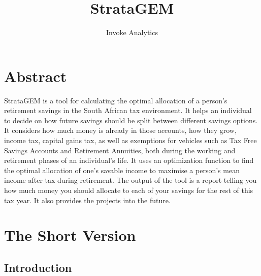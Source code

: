 \documentclass[a4paper, justified]{tufte-handout}
\title{StrataGEM}
\author[]{Invoke Analytics}
\newcommand{\blankpage}{\newpage\hbox{}\thispagestyle{empty}\newpage}
\begin{document}



\maketitle


\begin{fullwidth}

\setlength{\parindent}{0pt}



\end{fullwidth}








\section{Abstract} \label{ch:intro}
StrataGEM is a tool for calculating the optimal allocation of a person's retirement savings in the South African tax environment. It helps an individual to decide on how future savings should be split between different savings options. It considers how much money is already in those accounts, how they grow, income tax, capital gains tax, as well as exemptions for vehicles such as Tax Free Savings Accounts and Retirement Annuities, both during the working and retirement phases of an individual's life. It uses an optimization function to find the optimal allocation of one's savable income to maximise a person's mean income after tax during retirement. The output of the tool is a report telling you how much money you should allocate to each of your savings for the rest of this tax year. It also provides the projects into the future.

\section{The Short Version}
\subsection{Introduction}
\end{document}
